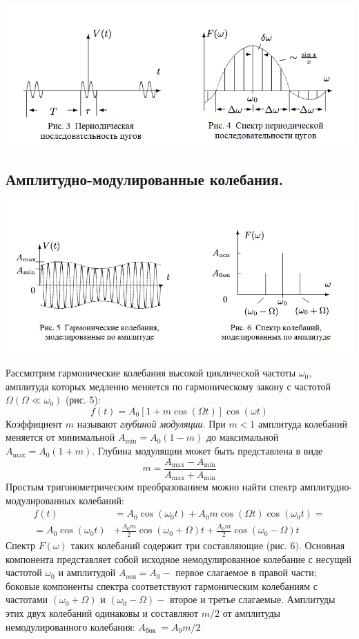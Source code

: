\documentclass[a4paper,12pt]{article} %
\begin{document}
\begin{center}
\includegraphics[width=0.7\linewidth]{3.jpg}\\
\end{center}

\subsection{Амплитудно-модулированные колебания.}

\begin{center}
\includegraphics[width=0.7\linewidth]{4.jpg}\\
\end{center}
 Рассмотрим гармонические колебания высокой циклической частоты $\omega_{0},$ амплитуда которых медленно меняется по гармоническому закону с частотой $\Omega\left(\Omega \ll \omega_{0}\right)$ (рис. 5):
$$
f(t)=A_{0}[1+m \cos (\Omega t)] \cos (\omega t)
$$
Коэффициент $m$ называют \textit {глубиной модуляции}. При $m<1$ амплитуда колебаний меняется от минимальной $A_{\min }=A_{0}(1-m)$ до максимальной $A_{\max }=A_{0}(1+m) .$ Глубина модулящии может быть представлена в виде
$$
m=\frac{A_{\max }-A_{\min }}{A_{\max }+A_{\min }}
$$
Простым тригонометрическим преобразованием можно найти спектр амплитудно-модулированных колебаний:
$$
\begin{aligned}
f(t) &=A_{0} \cos \left(\omega_{0} t\right)+A_{0} m \cos (\Omega t) \cos \left(\omega_{0} t\right)=\\
=A_{0} \cos \left(\omega_{0} t\right) &+\frac{A_{0} m}{2} \cos \left(\omega_{0}+\Omega\right) t+\frac{A_{0} m}{2} \cos \left(\omega_{0}-\Omega\right) t
\end{aligned}
$$
\hfill \break
Спектр $F(\omega)$ таких колебаний содержит три составляющие (рис. 6$)$. Основная компонента представляет собой исходное немодулированное колебание с несущей частотой $\omega_{0}$ и амплитудой $A_{\text{ocн}}=A_{0}-$ первое слагаемое в правой части; боковые компоненты спектра соответствуют гармоническим колебаниям с частотами $\left(\omega_{0}+\Omega\right)$ и $\left(\omega_{0}-\Omega\right)-$ второе и третье слагаемые. Амплитуды этих двух колебаний одинаковы и составляют $m / 2$ от амплитуды немодулированного колебания: $A_{\text {бок }}=A_{0} m / 2$
\end{document}
